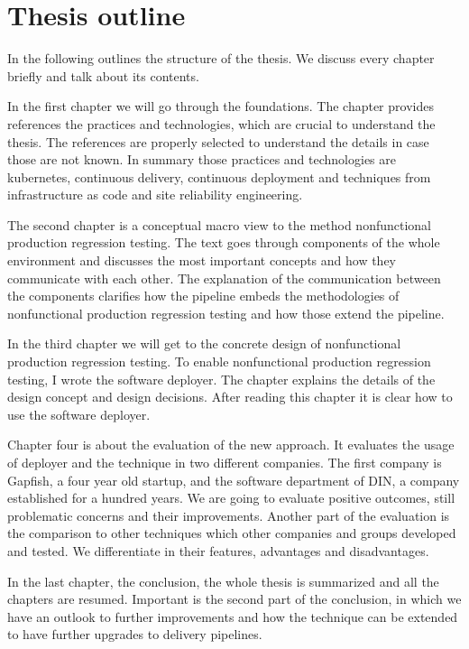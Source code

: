 \section{Thesis outline}

In the following outlines the structure of the thesis. We discuss every chapter briefly
and talk about its contents.

In the first chapter we will go through the foundations. The chapter provides references
the practices and technologies, which are crucial to understand the thesis. The references
are properly selected to understand the details in case those are not known. In summary
those practices and technologies are kubernetes, continuous delivery, continuous
deployment and techniques from infrastructure as code and site reliability engineering.

The second chapter is a conceptual macro view to the method nonfunctional production
regression testing. The text goes through components of the whole environment and
discusses the most important concepts and how they communicate with each other. The
explanation of the communication between the components clarifies how the pipeline embeds
the methodologies of nonfunctional production regression testing and how those extend the
pipeline.

In the third chapter we will get to the concrete design of nonfunctional production
regression testing. To enable nonfunctional production regression testing, I wrote the
software deployer.  The chapter explains the details of the design concept and design
decisions. After reading this chapter it is clear how to use the software deployer.

Chapter four is about the evaluation of the new approach. It evaluates the usage of
deployer and the technique in two different companies. The first company is Gapfish, a
four year old startup, and the software department of DIN, a company established for a
hundred years. We are going to evaluate positive outcomes, still problematic concerns and
their improvements. Another part of the evaluation is the comparison to other techniques
which other companies and groups developed and tested. We differentiate in their features,
advantages and disadvantages.

In the last chapter, the conclusion, the whole thesis is summarized and all the chapters
are resumed. Important is the second part of the conclusion, in which we have an outlook
to further improvements and how the technique can be extended to have further upgrades to
delivery pipelines.

